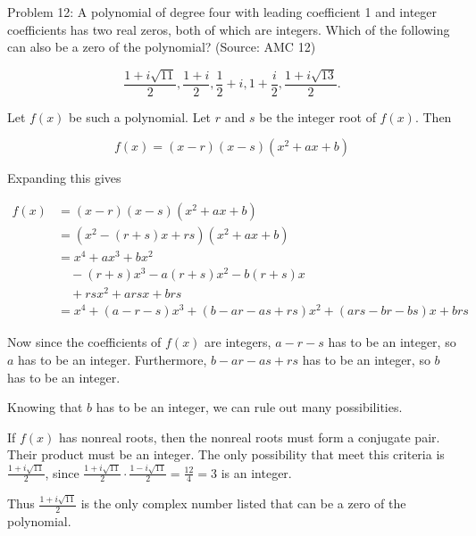 Problem 12: A polynomial of degree four with leading coefficient 1 and integer coefficients has two real zeros, both of which are integers. Which of the following can also be a zero of the polynomial? (Source: AMC 12)

$$ \frac{1 + i \sqrt{11}}{2}, \frac{1 + i}{2}, \frac{1}{2} + i, 1 + \frac{i}{2}, \frac{1 + i \sqrt{13}}{2}. $$

Let $f(x)$ be such a polynomial. Let $r$ and $s$ be the integer root of $f(x)$. Then

$$ f(x) = (x - r)(x - s)(x^2 + ax + b) $$

Expanding this gives

\begin{align*}
f(x) &= (x - r)(x - s)(x^2 + ax + b) \\
&= (x^2 - (r + s)x + rs)(x^2 + ax + b) \\
&= x^4 + ax^3 + bx^2 \\
& \quad - (r + s)x^3 - a(r + s)x^2 - b(r + s)x \\
& \quad + rsx^2 + arsx + brs \\
&= x^4 + (a - r - s)x^3 + (b - ar - as + rs)x^2 + (ars - br - bs)x + brs
\end{align*}

Now since the coefficients of $f(x)$ are integers, $a - r - s$ has to be an integer, so $a$ has to be an integer. Furthermore, $b - ar - as + rs$ has to be an integer, so $b$ has to be an integer.

Knowing that $b$ has to be an integer, we can rule out many possibilities. 

If $f(x)$ has nonreal roots, then the nonreal roots must form a conjugate pair. Their product must be an integer. The only possibility that meet this criteria is $\displaystyle \frac{1 + i \sqrt{11}}{2}$, since $\displaystyle \frac{1 + i \sqrt{11}}{2} \cdot \frac{1 - i \sqrt{11}}{2} = \frac{12}{4} = 3$ is an integer.

Thus $\boxed{\displaystyle \frac{1 + i \sqrt{11}}{2}}$ is the only complex number listed that can be a zero of the polynomial.
